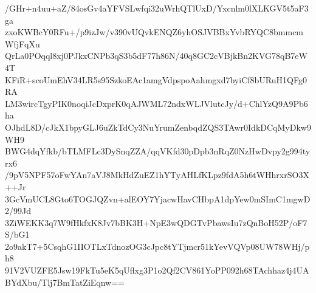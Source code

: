 /GHr+n4uu+aZ/84osGv4aYFVSLwfqi32uWrhQTlUxD/Yxcnlm0lXLKGV5t5aF3ga
zxoKWBcY0RFu+/p9izJw/v390vUQvkENQZ6yhOSJVBBxYvbRYQC8bmmcmWfjFqXu
QrLa0POqql8xj0PJkxCNPb3qS3b5dF77h86N/40q8GC2cVBjkBn2KVG78qB7eW4T
KFiR+scoUmEhV34LR5s95SzkoEAc1amgVdpspoAahmgxd7byiCf8bURuH1QFg0RA
LM3wircTgyPIK0noqiJcDxprK0qAJWML72ndxWLJVlutcJy/d+ChlYzQ9A9Pb6ha
OJhdL8D/cJkX1bpyGLJ6uZkTdCy3NuYrumZenbqdZQS3TAwr0IdkDCqMyDkw9WH9
BWG4dqYfkb/bTLMFLc3DySnqZZA/qqVKfd30pDpb3nRqZ0NzHwDvpy2g994tyrx6
/9pV5NPF57oFwYAn7aVJ8MkHdZuEZ1hYTyAHLfKLpz9fdA5h6tWHhrxrSO3X++Jr
3GcVmUCL8Gto6TOGJQZvn+alEOY7YjacwHavCHbpA1dpYew0mSImC1mgwD2/99Jd
3ZiWEKK3q7W9fHkfxK8Jv7bBK3H+NpE3wQDGTvPbawsIu7zQnBoH52P/oF7S/bG1
2o9akT7+5CsqhG1IIOTLxTdnozOG3cJpc8tYTjmcr51kYevVQVp08UW78WHj/ph8
91V2VUZFE5Jsw19FkTu5eK5qUflxg3P1o2Qf2CV861YoPP092h68TAchhaz4j4UA
BYdXbu/Tlj7BmTatZiEqnw==
